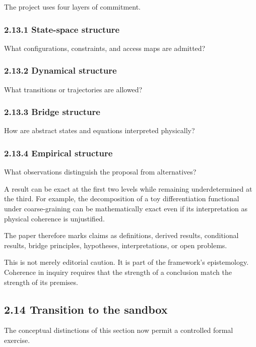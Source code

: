 \documentclass[
  11pt,
]{article}
\begin{document}
The project uses four layers of commitment.

\subsubsection{2.13.1 State-space
structure}\label{state-space-structure}

What configurations, constraints, and access maps are admitted?

\subsubsection{2.13.2 Dynamical structure}\label{dynamical-structure}

What transitions or trajectories are allowed?

\subsubsection{2.13.3 Bridge structure}\label{bridge-structure}

How are abstract states and equations interpreted physically?

\subsubsection{2.13.4 Empirical structure}\label{empirical-structure}

What observations distinguish the proposal from alternatives?

A result can be exact at the first two levels while remaining
underdetermined at the third. For example, the decomposition of a toy
differentiation functional under coarse-graining can be mathematically
exact even if its interpretation as physical coherence is unjustified.

The paper therefore marks claims as definitions, derived results,
conditional results, bridge principles, hypotheses, interpretations, or
open problems.

This is not merely editorial caution. It is part of the framework's
epistemology. Coherence in inquiry requires that the strength of a
conclusion match the strength of its premises.

\subsection{2.14 Transition to the
sandbox}\label{transition-to-the-sandbox}

The conceptual distinctions of this section now permit a controlled
formal exercise.
\end{document}
